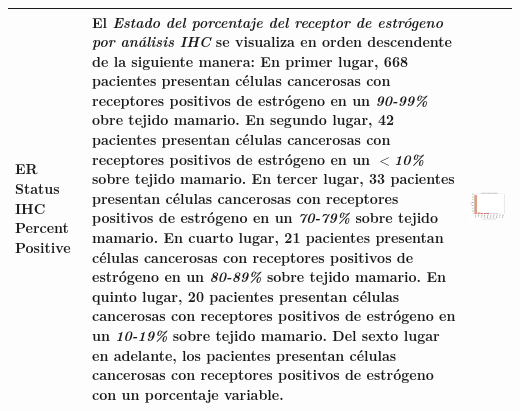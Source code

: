 \begin{table}[!htb]
	\footnotesize
	\begin{threeparttable}
		\begin{tabular}{p{2.5cm} p{7cm} p{6.5cm}} \toprule
			ER Status IHC Percent Positive
			&El \textit{Estado del porcentaje del receptor de estrógeno por análisis IHC} se visualiza en orden descendente de la siguiente manera: En primer lugar, 668 pacientes presentan células cancerosas con receptores positivos de estrógeno en un \textit{90-99\%} obre tejido mamario. En segundo lugar, 42 pacientes presentan células cancerosas con receptores positivos de estrógeno en un $<$\textit{10\%} sobre tejido mamario. En tercer lugar, 33 pacientes presentan células cancerosas con receptores positivos de estrógeno en un \textit{70-79\%} sobre tejido mamario. En cuarto lugar, 21 pacientes presentan células cancerosas con receptores positivos de estrógeno en un \textit{80-89\%} sobre tejido mamario. En quinto lugar, 20 pacientes presentan células cancerosas con receptores positivos de estrógeno en un \textit{10-19\%} sobre tejido mamario. Del sexto lugar en adelante, los pacientes presentan células cancerosas con receptores positivos de estrógeno con un porcentaje variable.
			& \begin{center}\includegraphics[width=1\linewidth]{NOTEBOOK/IMAGENES_DESCRIPTIVAS/12_er_status_ihc_percent_positive}\end{center}
			\\ \hline

\end{tabular}
\end{threeparttable}
\end{table}

